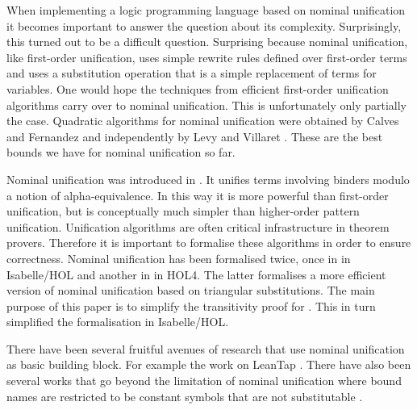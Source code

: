 \begin{isabellebody}
\begin{isamarkuptext}
  When implementing a logic programming language based on nominal unification
  it becomes important to answer the question about its complexity.  Surprisingly,
  this turned out to be a difficult question. Surprising because nominal unification,
  like first-order unification, uses simple rewrite rules defined over first-order 
  terms and uses a substitution operation that is a simple replacement of terms 
  for variables. One would hope the techniques from efficient first-order unification
  algorithms carry over to nominal unification. This is unfortunately only partially
  the case. Quadratic algorithms for nominal unification were obtained by 
  Calves and Fernandez \cite{CalvesFernandez08,Calves10} and independently 
  by Levy and Villaret \cite{levyvillaret10}. These are the best bounds we have 
  for nominal unification so far.\end{isamarkuptext}\isamarkuptrue {}
\isamarkuptrue \begin{isamarkuptext}Nominal unification was introduced in \cite{UrbanPittsGabbay04}. It unifies terms
  involving binders modulo a notion of alpha-equivalence. In this way it is more
  powerful than first-order unification, but is conceptually much simpler than
  higher-order pattern unification. Unification algorithms are often critical
  infrastructure in theorem provers. Therefore it is important to formalise
  these algorithms in order to ensure correctness. Nominal unification has
  been formalised twice, once in \cite{UrbanPittsGabbay04} in Isabelle/HOL 
  and another in \cite{KumarNorrish10} in HOL4. The latter formalises a more 
  efficient version of nominal unification based on triangular substitutions. 
  The main purpose of this paper is to simplify the transitivity proof for . 
  This in turn simplified the formalisation in Isabelle/HOL.

  There have been several fruitful avenues of research that use nominal unification
  as basic building block. For example the work  on LeanTap \cite{alphaleantap08}. 
  There have also been several works that go beyond the limitation
  of nominal unification where bound names are restricted to be constant symbols that are not 
  substitutable \cite{PittsAM:residb,PittsAM:nomel}.\end{isamarkuptext}\isamarkuptrue \isadelimtheory
\endisadelimtheory
\isatagtheory
\endisatagtheory
{\isafoldtheory}\isadelimtheory
\endisadelimtheory
\end{isabellebody}
